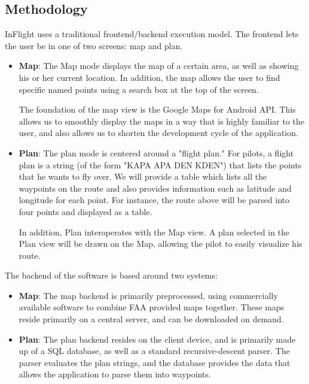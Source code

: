\documentclass[10pt,a4paper]{article}
\begin{document}
\subsection{Methodology}
InFlight uses a traditional frontend/backend execution model. The frontend lets the user be in one of two screens: map and plan. 
\begin{itemize}
\item \textbf{Map}: The Map mode displays the map of a certain area, as well as showing his or her current location. In addition, the map allows the user to find specific named points using a search box at the top of the screen.

The foundation of the map view is the Google Maps for Android API. This allows us to smoothly display the maps in a way that is highly familiar to the user, and also allows us to shorten the development cycle of the application.
\item \textbf{Plan}: The plan mode is centered around a "flight plan." For pilots, a flight plan is a string (of the form "KAPA APA DEN KDEN") that lists the points that he wants to fly over. We will provide a table which lists all the waypoints on the route and also provides information such as latitude and longitude for each point. For instance, the route above will be parsed into four points and displayed as a table. 

In addition, Plan interoperates with the Map view. A plan selected in the Plan view will be drawn on the Map, allowing the pilot to easily visualize his route.
\end{itemize}
The backend of the software is based around two systems:
\begin{itemize}
\item \textbf{Map}: The map backend is primarily preprocessed, using commercially available software to combine FAA provided maps together. These maps reside primarily on a central server, and can be downloaded on demand.
\item \textbf{Plan}: The plan backend resides on the client device, and is primarily made up of a SQL database, as well as a standard recursive-descent parser. The parser evaluates the plan strings, and the database provides the data that allows the application to parse them into waypoints.
\end{itemize}
\end{document}
